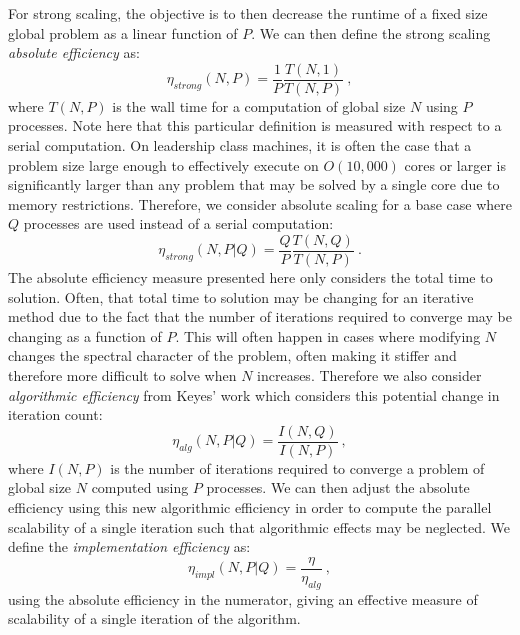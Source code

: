 For strong scaling, the objective is to then decrease the runtime of a
fixed size global problem as a linear function of $P$. We can then
define the strong scaling \textit{absolute efficiency} as:
\begin{equation}
  \eta_{strong}(N,P) = \frac{1}{P} \frac{T(N,1)}{T(N,P)}\:,
  \label{eq:strong_scaling_absolute}
\end{equation}
where $T(N,P)$ is the wall time for a computation of global size $N$
using $P$ processes. Note here that this particular definition is
measured with respect to a serial computation. On leadership class
machines, it is often the case that a problem size large enough to
effectively execute on $O(10,000)$ cores or larger is significantly
larger than any problem that may be solved by a single core due to
memory restrictions. Therefore, we consider absolute scaling for a
base case where $Q$ processes are used instead of a serial
computation:
\begin{equation}
  \eta_{strong}(N,P|Q) = \frac{Q}{P} \frac{T(N,Q)}{T(N,P)}\:.
  \label{eq:strong_scaling_absolute_ref}
\end{equation}
The absolute efficiency measure presented here only considers the
total time to solution. Often, that total time to solution may be
changing for an iterative method due to the fact that the number of
iterations required to converge may be changing as a function of
$P$. This will often happen in cases where modifying $N$ changes the
spectral character of the problem, often making it stiffer and
therefore more difficult to solve when $N$ increases. Therefore we
also consider \textit{algorithmic efficiency} from Keyes' work which
considers this potential change in iteration count:
\begin{equation}
  \eta_{alg}(N,P|Q) = \frac{I(N,Q)}{I(N,P)}\:,
  \label{eq:algorithmic_efficiency}
\end{equation}
where $I(N,P)$ is the number of iterations required to converge a
problem of global size $N$ computed using $P$ processes. We can then
adjust the absolute efficiency using this new algorithmic efficiency
in order to compute the parallel scalability of a single iteration
such that algorithmic effects may be neglected. We define the
\textit{implementation efficiency} as:
\begin{equation}
  \eta_{impl}(N,P|Q) = \frac{\eta}{\eta_{alg}}\:,
  \label{eq:implementation efficiency}
\end{equation}
using the absolute efficiency in the numerator, giving an effective
measure of scalability of a single iteration of the algorithm.

